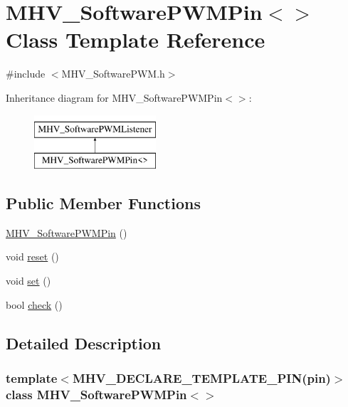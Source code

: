 \hypertarget{class_m_h_v___software_p_w_m_pin}{
\section{\-M\-H\-V\-\_\-\-Software\-P\-W\-M\-Pin$<$$>$ \-Class \-Template \-Reference}
\label{class_m_h_v___software_p_w_m_pin}
}


{\ttfamily \#include $<$\-M\-H\-V\-\_\-\-Software\-P\-W\-M.\-h$>$}

\-Inheritance diagram for \-M\-H\-V\-\_\-\-Software\-P\-W\-M\-Pin$<$$>$\-:\begin{figure}[H]
\begin{center}
\leavevmode
\includegraphics[height=2.000000cm]{class_m_h_v___software_p_w_m_pin}
\end{center}
\end{figure}
\subsection*{\-Public \-Member \-Functions}
\begin{DoxyCompactItemize}
\item 
\hyperlink{class_m_h_v___software_p_w_m_pin_a939edcff3e640598b4e41756135ae83d}{\-M\-H\-V\-\_\-\-Software\-P\-W\-M\-Pin} ()
\item 
void \hyperlink{class_m_h_v___software_p_w_m_pin_a57733b6d872cfd1fe63a30766601eb87}{reset} ()
\item 
void \hyperlink{class_m_h_v___software_p_w_m_pin_aace178b9ef1123317c67f35f9b8ee7e8}{set} ()
\item 
bool \hyperlink{class_m_h_v___software_p_w_m_pin_ac7538132834fb5fca1a04b213cc431c8}{check} ()
\end{DoxyCompactItemize}


\subsection{\-Detailed \-Description}
\subsubsection*{template$<$\-M\-H\-V\-\_\-\-D\-E\-C\-L\-A\-R\-E\-\_\-\-T\-E\-M\-P\-L\-A\-T\-E\-\_\-\-P\-I\-N(pin)$>$class M\-H\-V\-\_\-\-Software\-P\-W\-M\-Pin$<$$>$}



